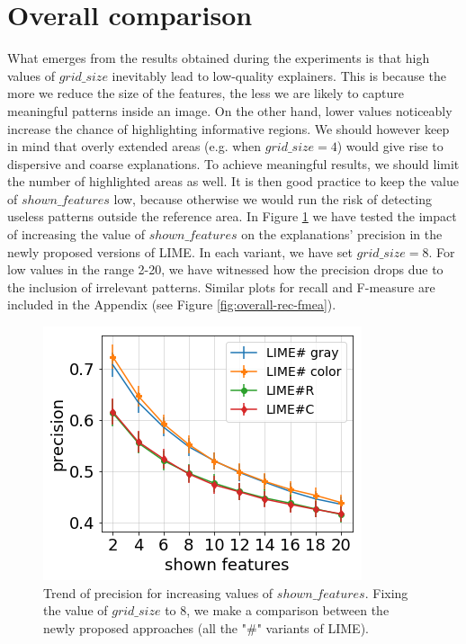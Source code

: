 \documentclass[12pt, twoside, a4paper]{report}
\begin{document}
\section{Overall comparison}



What emerges from the results obtained during the experiments is that high values of $grid\_size$ inevitably lead to low-quality explainers. This is because the more we reduce the size of the features, the less we are likely to capture meaningful patterns inside an image. On the other hand, lower values noticeably increase the chance of highlighting informative regions. We should however keep in mind that overly extended areas (e.g. when $grid\_size = 4$) would give rise to dispersive and coarse explanations.
To achieve meaningful results, we should limit the number of highlighted areas as well. It is then good practice to keep the value of $shown\_features$ low, because otherwise we would run the risk of detecting useless patterns outside the reference area. In Figure \ref{fig:overall-prec} we have tested the impact of increasing the value of $shown\_features$ on the explanations' precision in the newly proposed versions of LIME. In each variant, we have set $grid\_size = 8$. For low values in the range 2-20, we have witnessed how the precision drops due to the inclusion of irrelevant patterns. Similar plots for recall and F-measure are included in the Appendix (see Figure \ref{fig:overall-rec-fmea}).

\begin{figure}
\centering
\includegraphics[width=.5\textwidth]{images/overall-figs/precision.png} 
\caption{Trend of precision for increasing values of $shown\_features$. Fixing the value of $grid\_size$ to 8, we make a comparison between the newly proposed approaches (all the "\#" variants of LIME).}
\label{fig:overall-prec}
\end{figure}
\end{document}
